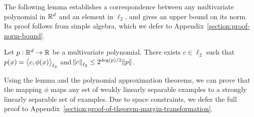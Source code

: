 The following lemma establishes a correspondence between any multivariate
polynomial in $\mathbb{R}^d$ and an element in $\ell_2$, and gives an upper bound on its
norm. Its proof follows from simple algebra, which we defer to
Appendix~\ref{section:proof-norm-bound}.

\begin{lemma}
\label{lemma:norm-bound}
Let $p:\mathbb{R}^d \to \mathbb{R}$ be a multivariate polynomial.
There exists $c \in \ell_2$ such that $p(x) = \left\langle c, \phi(x) \right\rangle_{\ell_2}$
and $\norm{c}_{\ell_2} \le 2^{\deg(p)/2} \norm{p}$.
\end{lemma}

Using the lemma and the polynomial approximation theorems, we can prove that the
mapping $\phi$ maps any set of weakly linearly separable examples to a strongly
linearly separable set of examples. Due to space constraints, we defer the full
proof to Appendix~\ref{section:proof-of-theorem-margin-transformation}.





